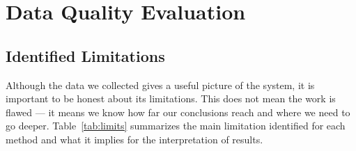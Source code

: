 \documentclass[12pt, onecolumn]{IEEEtran}
\begin{document}
\section{Data Quality Evaluation}

\subsection{Identified Limitations}

Although the data we collected gives a useful picture of the system, it
is important to be honest about its limitations. This does not mean the
work is flawed --- it means we know how far our conclusions reach and
where we need to go deeper. Table~\ref{tab:limits} summarizes the main
limitation identified for each method and what it implies for the
interpretation of results.
\end{document}
